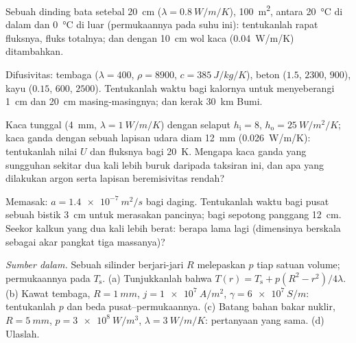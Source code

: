 \begin{exercise}[$\star$]\label{exo:b2:heat-conduction:1}
Sebuah dinding bata setebal \qty{20}{cm} ($\lambda = \qty{0.8}{W/m/K}$), \qty{100}{m^2},
antara \qty{20}{\celsius} di dalam dan \qty{0}{\celsius} di luar
(permukaannya pada suhu ini): tentukanlah rapat fluksnya, fluks totalnya; dan dengan
\qty{10}{cm} wol kaca (\qty{0.04}{W/m/K}) ditambahkan.
\end{exercise}

\begin{exercise}[$\star$]\label{exo:b2:heat-conduction:2}
Difusivitas: tembaga ($\lambda = 400$, $\rho = 8900$, $c = \qty{385}{J/kg/K}$),
beton ($1.5$, $2300$, $900$), kayu ($0.15$, $600$, $2500$). Tentukanlah waktu bagi kalornya
untuk menyeberangi \qty{1}{cm} dan \qty{20}{cm} masing-masingnya; dan kerak \qty{30}{km}
Bumi.
\end{exercise}

\begin{exercise}[$\star$]\label{exo:b2:heat-conduction:3}
Kaca tunggal (\qty{4}{mm}, $\lambda = \qty{1}{W/m/K}$) dengan selaput $h_{\text{i}}
= 8$, $h_{\text{o}} = \qty{25}{W/m^2/K}$; kaca ganda dengan sebuah lapisan
udara diam \qty{12}{mm} (\qty{0.026}{W/m/K}): tentukanlah nilai $U$ dan fluksnya bagi
\qty{20}{K}. Mengapa kaca ganda yang sungguhan sekitar dua kali lebih buruk daripada taksiran
ini, dan apa yang dilakukan argon serta lapisan beremisivitas rendah?
\end{exercise}

\begin{exercise}[$\star$]\label{exo:b2:heat-conduction:4}
Memasak: $a = \qty{1.4e-7}{m^2/s}$ bagi daging. Tentukanlah waktu bagi pusat sebuah
bistik \qty{3}{cm} untuk merasakan pancinya; bagi sepotong panggang \qty{12}{cm}. Seekor kalkun
yang dua kali lebih berat: berapa lama lagi (dimensinya berskala sebagai akar pangkat tiga
massanya)?
\end{exercise}

\begin{exercise}[$\star\star$]\label{exo:b2:heat-conduction:5}
\emph{Sumber dalam.} Sebuah silinder berjari-jari $R$ melepaskan $p$ tiap satuan
volume; permukaannya pada $T_{\text{s}}$. (a) Tunjukkanlah bahwa $T(r) = T_{\text{s}} +
p(R^2 - r^2)/4\lambda$. (b) Kawat tembaga, $R = \qty{1}{mm}$, $j =
\qty{1e7}{A/m^2}$, $\gamma = \qty{6e7}{S/m}$: tentukanlah $p$ dan beda pusat--permukaannya.
(c) Batang bahan bakar nuklir, $R = \qty{5}{mm}$, $p = \qty{3e8}{W/m^3}$,
$\lambda = \qty{3}{W/m/K}$: pertanyaan yang sama. (d) Ulaslah.
\end{exercise}

